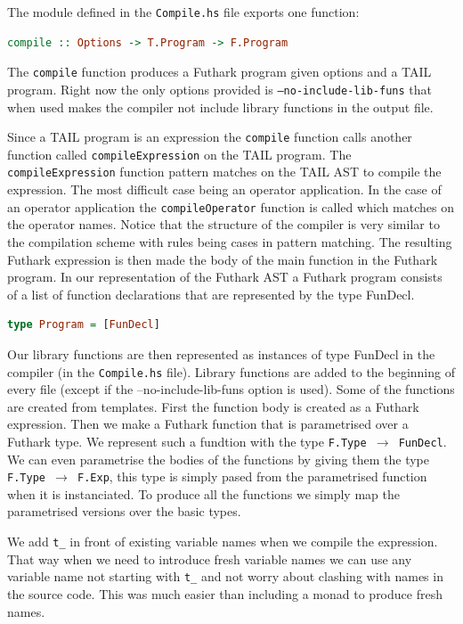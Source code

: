 \documentclass[11pt]{article}
\begin{document}
The module defined in the {\tt Compile.hs} file exports one function:
\begin{lstlisting}[language=haskell]
compile :: Options -> T.Program -> F.Program
\end{lstlisting}

The {\tt compile} function produces a Futhark program given options and a TAIL program. 
Right now the only options provided is {\tt --no-include-lib-funs} that when used makes the compiler not include library functions in the output file. 

Since a TAIL program is an expression the {\tt compile} function calls another function called {\tt compileExpression} on the TAIL program. The {\tt compileExpression} function pattern matches on the TAIL AST to compile the expression. The most difficult case being an operator application. In the case of an operator application the {\tt compileOperator} function is called which matches on the operator names. Notice that the structure of the compiler is very similar to the compilation scheme with rules being cases in pattern matching.
The resulting Futhark expression is then made the body of the main
function in the Futhark program. 
In our representation of the Futhark AST a Futhark program consists of a list of function declarations that are represented by the type FunDecl. 

\begin{lstlisting}[language=haskell]
type Program = [FunDecl]
\end{lstlisting}

Our library functions are then represented as instances of type FunDecl in the compiler (in the {\tt Compile.hs} file).
Library functions are added to the beginning of every file (except if the --no-include-lib-funs option is used). 
Some of the functions are created from templates. First the function body is created as a Futhark expression. Then we make a Futhark function that is parametrised over a Futhark type. We represent such a fundtion with the type {\tt F.Type $\rightarrow$ FunDecl}. We can even parametrise the bodies of the functions by giving them the type {\tt F.Type $\rightarrow$ F.Exp}, this type is simply pased from the parametrised function when it is instanciated. To produce all the functions we simply map the parametrised versions over the basic types. 

We add {\tt t\_} in front of existing variable names when we compile the expression. That way when we need to introduce fresh variable names we can use any variable name not starting with {\tt t\_} and not worry about clashing with names in the source code. This was much easier than including a monad to produce fresh names. 
\end{document}
